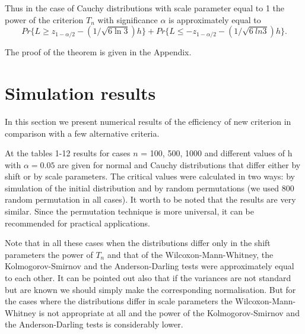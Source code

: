 \documentclass{svproc}
\begin{document}
Thus in the case of Cauchy distributions with scale parameter equal to 1  the power of the criterion $T_n$ with significance $\alpha$ is approximately equal to
$$
Pr\{L\geq z_{1-\alpha/2}-(1/\sqrt{6\ln 3})h\}
+ Pr\{L\leq - z_{1-\alpha/2}-(1/\sqrt{6\
ln 3})h\}.
$$



The proof of the theorem is given in the Appendix.

\section{Simulation results}



In this section we present numerical results of the efficiency of new criterion in comparison with a few alternative criteria.%

 At the tables 1-12 results for cases $n$ = 100, 500, 1000 and different values of h with $\alpha=0.05$ are given for normal and Cauchy distributions that differ either by shift or by scale parameters. The critical values were calculated in two ways: by simulation of the initial distribution and by random permutations (we used 800 random permutation in all cases). It worth to be noted that the results are very similar. Since the permutation technique is more universal, it can be recommended for practical applications.


Note that in all these cases when the distributions differ only in the shift parameters the power of  $T_n$ and  that of the Wilcoxon-Mann-Whitney, the
Kol\-mogorov-Smirnov and the Anderson-Darling tests were approximately equal to each other.
It can be pointed out also that if the variances are not standard  but are known we should simply make the corresponding normalisation.
But for the cases where the distributions differ in scale parameters the Wilcoxon-Mann-Whitney is not appropriate at all and the power of  the Kolmogorov-Smirnov and the Anderson-Darling tests is considerably lower.


\end{document}
